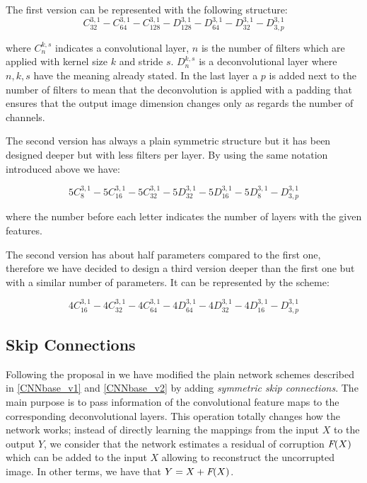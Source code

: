 \documentclass[12pt,a4paper]{report}
\begin{document}
The first version can be represented with the following structure: 
\begin{equation}
C_{32}^{3,1} - C_{64}^{3,1} - C_{128}^{3,1} - D_{128}^{3,1} - D_{64}^{3,1} - D_{32}^{3,1} - D_{3,p}^{3,1} 
\label{CNNbase_v1}
\end{equation}

where $C_n^{k,s}$ indicates a convolutional layer, $n$ is the number of filters which are applied with kernel size $k$ and stride $s$. $D_n^{k,s}$ is a deconvolutional layer where $n, k, s$ have the meaning already stated. In the last layer a $p$ is added next to the number of filters to mean that the deconvolution is applied with a padding that ensures that the output image dimension changes only as regards the number of channels.

The second version has always a plain symmetric structure but it has been designed deeper but with less filters per layer. By using the same notation introduced above we have: 

\begin{equation}
5C_{8}^{3,1} - 5C_{16}^{3,1} - 5C_{32}^{3,1} - 5D_{32}^{3,1} - 5D_{16}^{3,1} - 5D_{8}^{3,1} - D_{3,p}^{3,1} 
\label{CNNbase_v2}
\end{equation}

where the number before each letter indicates the number of layers with the given features. 

The second version has about half parameters compared to the first one, therefore we have decided to design a third version deeper than the first one but with a similar number of parameters. It can be represented by the scheme:

\begin{equation}
4C_{16}^{3,1} - 4C_{32}^{3,1} - 4C_{64}^{3,1} - 4D_{64}^{3,1} - 4D_{32}^{3,1} - 4D_{16}^{3,1} - D_{3,p}^{3,1} 
\label{CNNbase_v2}
\end{equation}

\subsection{Skip Connections}

Following the proposal in \cite{M&Al} we have modified the plain network schemes described in \eqref{CNNbase_v1} and \eqref{CNNbase_v2} by adding \textit{symmetric skip connections}. The main purpose is to pass information of the convolutional feature maps to the corresponding deconvolutional layers. This operation totally changes how the network works; instead of directly learning the mappings from the input $X$ to the output $Y$, we consider that the network estimates a residual of corruption $\emph{F}(X)$ which can be added to the input $X$ allowing to reconstruct the uncorrupted image. In other terms, we have that $Y = X + \emph{F}(X)$.
\end{document}

